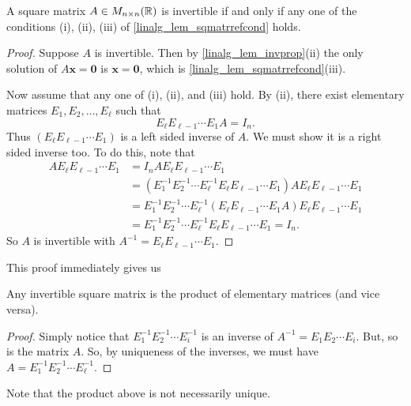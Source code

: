 \documentclass[10pt, a4paper]{article}
\newcommand{\mbf}[1]{\mathbf{#1}}
\begin{document}
\begin{theorem}\label{linalg_thm_fundthmofinvertmatr}
    A square matrix $A \in M_{n \times n}(\mathbb{R})$ is invertible if and only if any one of the conditions (i), (ii), (iii) of \autoref{linalg_lem_sqmatrrefcond} holds.
    \begin{proof}
        Suppose $A$ is invertible.
        Then by \autoref{linalg_lem_invprop}(ii) the only solution of $A\mbf{x} = \mbf{0}$ is $\mbf{x} = \mbf{0}$,
        which is \autoref{linalg_lem_sqmatrrefcond}(iii).

        Now assume that any one of (i), (ii), and (iii) hold.
        By (ii), there exist elementary matrices $E_1, E_2, \dotsc, E_\ell$ such that
        \[
        E_\ell E_{\ell - 1} \dotsi E_1 A = I_n.
        \]
        Thus $(E_\ell E_{\ell - 1} \dotsi E_1)$ is a left sided inverse of $A$.
        We must show it is a right sided inverse too.
        To do this, note that
        \begin{align*}
            AE_\ell E_{\ell - 1} \dotsi E_1 &= I_n A E_\ell E_{\ell - 1} \dotsi E_1 \\
            &= (E_1 ^ {-1} E_2 ^ {-1} \dotsi E_{\ell} ^ {-1}E_\ell E_{\ell - 1} \dotsi E_1)AE_\ell E_{\ell - 1} \dotsi E_1 \\
            &= E_1 ^ {-1} E_2 ^ {-1} \dotsi E_{\ell} ^ {-1}(E_\ell E_{\ell - 1} \dotsi E_1A)E_\ell E_{\ell - 1} \dotsi E_1 \\
            &= E_1 ^ {-1} E_2 ^ {-1} \dotsi E_{\ell} ^ {-1}E_\ell E_{\ell - 1} \dotsi E_1 = I_n.
        \end{align*}
        So $A$ is invertible with $A ^ {-1} = E_\ell E_{\ell - 1} \dotsi E_1$.
    \end{proof}
\end{theorem}
This proof immediately gives us
\begin{corollary}\label{pre_linalg_col_invisprodofele}
    Any invertible square matrix is the product of elementary matrices (and vice versa).
    \begin{proof}
        Simply notice that $E_1 ^ {-1}E_2 ^ {-1} \dotsi E_i ^ {-1}$ is an inverse of $A ^ {-1} = E_1E_2 \dotsi E_i$.
        But, so is the matrix $A$.
        So, by uniqueness of the inverses,
        we must have $A = E_1 ^ {-1} E_2 ^ {-1} \dotsi E_\ell ^ {-1}$.
    \end{proof}
\end{corollary}

\begin{remark}
    Note that the product above is not necessarily unique.
\end{remark}
\end{document}
